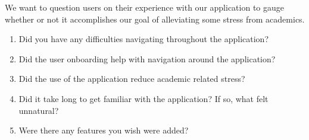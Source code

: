 \documentclass[12pt, titlepage]{article}
\begin{document}
We want to question users on their experience with our application to gauge whether or not it accomplishes our goal of alleviating some stress from academics. \\

\begin{enumerate}
\item{Did you have any difficulties navigating throughout the application?}
\item{Did the user onboarding help with navigation around the application?}
\item{Did the use of the application reduce academic related stress?}
\item{Did it take long to get familiar with the application? If so, what felt unnatural?}
\item{Were there any features you wish were added?}
\end{enumerate}
\end{document}
